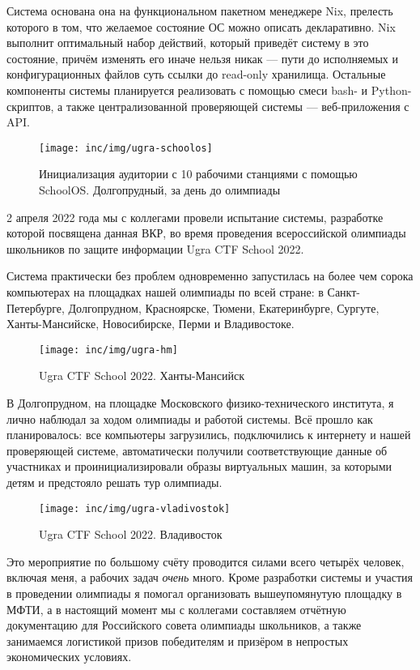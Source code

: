 Система основана она на функциональном пакетном менеджере Nix, прелесть которого в том, что желаемое состояние ОС можно описать декларативно. Nix выполнит оптимальный набор действий, который приведёт систему в это состояние, причём изменять его иначе нельзя никак — пути до исполняемых и конфигурационных файлов суть ссылки до read-only хранилища. Остальные компоненты системы планируется реализовать с помощью смеси bash- и Python-скриптов, а также централизованной проверяющей системы — веб-приложения с API.

\begin{figure}
  \centering
  \texttt{[image: inc/img/ugra-schoolos]}
  \caption{Инициализация аудитории с 10 рабочими станциями с помощью SchoolOS. Долгопрудный, за день до олимпиады}
\end{figure}

2 апреля 2022 года мы с коллегами провели испытание системы, разработке которой посвящена данная ВКР, во время проведения всероссийской олимпиады школьников по защите информации Ugra CTF School 2022.

Система практически без проблем одновременно запустилась на более чем сорока компьютерах на площадках нашей олимпиады по всей стране: в Санкт-Петербурге, Долгопрудном, Красноярске, Тюмени, Екатеринбурге, Сургуте, Ханты-Мансийске, Новосибирске, Перми и Владивостоке.

\begin{figure}
  \centering
  \texttt{[image: inc/img/ugra-hm]}
  \caption{Ugra CTF School 2022. Ханты-Мансийск}
\end{figure}

В Долгопрудном, на площадке Московского физико-технического института, я лично наблюдал за ходом олимпиады и работой системы. Всё прошло как планировалось: все компьютеры загрузились, подключились к интернету и нашей проверяющей системе, автоматически получили соответствующие данные об участниках и проинициализировали образы виртуальных машин, за которыми детям и
предстояло решать тур олимпиады.

\begin{figure}
  \centering
  \texttt{[image: inc/img/ugra-vladivostok]}
  \caption{Ugra CTF School 2022. Владивосток}
\end{figure}

Это мероприятие по большому счёту проводится силами всего четырёх человек, включая меня, а рабочих задач \textit{очень} много. Кроме разработки системы и участия в проведении олимпиады я помогал организовать вышеупомянутую площадку в МФТИ, а в настоящий момент мы с коллегами составляем отчётную документацию для Российского совета олимпиады школьников, а также занимаемся логистикой призов победителям и призёром в непростых экономических условиях.

